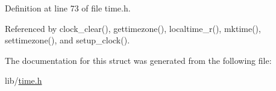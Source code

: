 Definition at line 73 of file time.\-h.



Referenced by clock\-\_\-clear(), gettimezone(), localtime\-\_\-r(), mktime(), settimezone(), and setup\-\_\-clock().



The documentation for this struct was generated from the following file\-:\begin{DoxyCompactItemize}
\item 
lib/\hyperlink{time_8h}{time.\-h}\end{DoxyCompactItemize}
